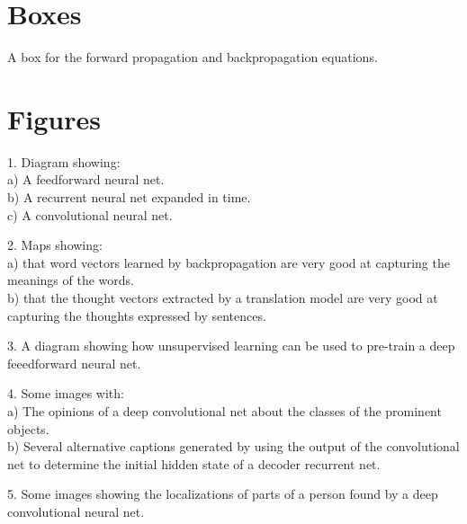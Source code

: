 \documentclass[]{article}
\begin{document}
\newpage

\section{Boxes}

A box for the forward propagation and backpropagation equations.

\section{Figures}

1. Diagram showing:\\ a) A feedforward neural net.\\ b) A recurrent neural
net expanded in time.\\ c) A convolutional neural net.

2. Maps showing:\\ a) that word vectors learned by backpropagation are very
good at capturing the meanings of the words.\\ b) that the thought vectors
extracted by a translation model are very good at capturing the thoughts
expressed by sentences.

3. A diagram showing how unsupervised learning can be used to pre-train a
deep feeedforward neural net.

4. Some images with:\\ a) The opinions of a deep convolutional net about
the classes of the prominent objects.\\ b) Several alternative captions
generated by using the output of the convolutional net to determine the
initial hidden state of a decoder recurrent net.
 
5. Some images showing the localizations of parts of a person found by a
deep convolutional neural net.\\
\end{document}
